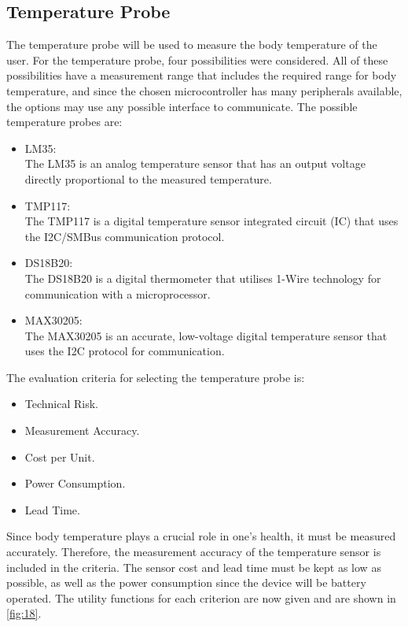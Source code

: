 \subsection{Temperature Probe}
The temperature probe will be used to measure the body temperature of the user. For the temperature probe, four possibilities were considered. All of these possibilities have a measurement range that includes the required range for body temperature, and since the chosen microcontroller has many peripherals available, the options may use any possible interface to communicate. The possible temperature probes are:
\begin{itemize}
	\item LM35:\\
	The LM35 is an analog temperature sensor that has an output voltage directly proportional to the measured temperature. 
	\item TMP117:\\
	The TMP117 is a digital temperature sensor integrated circuit (IC) that uses the I2C/SMBus communication protocol.
	\item DS18B20:\\
	The DS18B20 is a digital thermometer that utilises 1-Wire technology for communication with a microprocessor. 
	\item MAX30205:\\
	The MAX30205 is an accurate, low-voltage digital temperature sensor that uses the I2C protocol for communication.
\end{itemize}
\noindent
The evaluation criteria for selecting the temperature probe is:
\begin{itemize}[noitemsep]
	\item Technical Risk.
	\item Measurement Accuracy.
	\item Cost per Unit.
	\item Power Consumption.
	\item Lead Time.
\end{itemize}
\noindent
Since body temperature plays a crucial role in one's health, it must be measured accurately. Therefore, the measurement accuracy of the temperature sensor is included in the criteria. The sensor cost and lead time must be kept as low as possible, as well as the power consumption since the device will be battery operated. The utility functions for each criterion are now given and are shown in \autoref{fig:18}.
